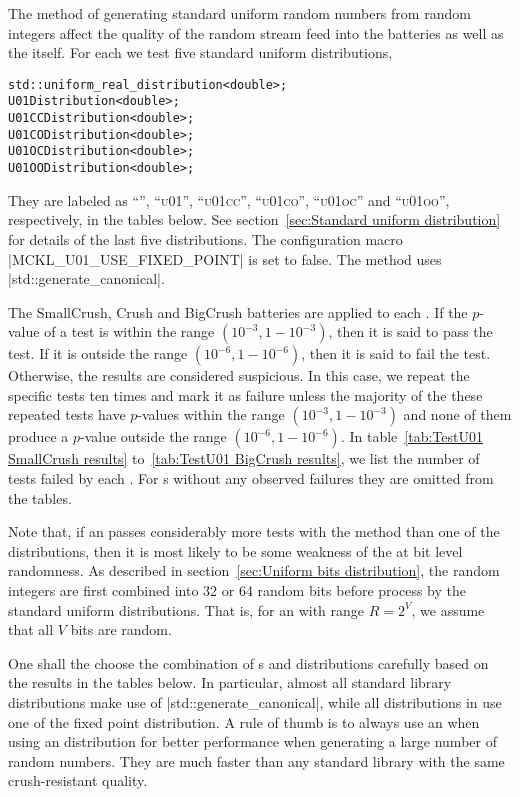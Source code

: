The method of generating standard uniform random numbers from random integers
affect the quality of the random stream feed into the \testu batteries as well
as the \rng itself. For each \rng we test five standard uniform distributions,
\begin{verbatim}
std::uniform_real_distribution<double>;
U01Distribution<double>;
U01CCDistribution<double>;
U01CODistribution<double>;
U01OCDistribution<double>;
U01OODistribution<double>;
\end{verbatim}
They are labeled as ``\std'', ``\textsc{u01}'', ``\textsc{u01cc}'',
``\textsc{u01co}'', ``\textsc{u01oc}'' and ``\textsc{u01oo}'', respectively, in
the tables below. See section~\ref{sec:Standard uniform distribution} for
details of the last five distributions. The configuration macro
|MCKL_U01_USE_FIXED_POINT| is set to false. The \std method uses
|std::generate_canonical|.

The SmallCrush, Crush and BigCrush batteries are applied to each \rng. If the
$p$-value of a test is within the range $(10^{-3}, 1 - 10^{-3})$, then it is
said to pass the test. If it is outside the range $(10^{-6}, 1 - 10^{-6})$,
then it is said to fail the test. Otherwise, the results are considered
suspicious. In this case, we repeat the specific tests ten times and mark it as
failure unless the majority of the these repeated tests have $p$-values within
the range $(10^{-3}, 1 - 10^{-3})$ and none of them produce a $p$-value outside
the range $(10^{-6}, 1 - 10^{-6})$. In table~\ref{tab:TestU01 SmallCrush
results} to~\ref{tab:TestU01 BigCrush results}, we list the number of tests
failed by each \rng. For \rng{}s without any observed failures they are omitted
from the tables.

Note that, if an \rng passes considerably more tests with the \std method than
one of the \mckl distributions, then it is most likely to be some weakness of
the \rng at bit level randomness. As described in section~\ref{sec:Uniform bits
distribution}, the random integers are first combined into 32 or 64 random bits
before process by the standard uniform distributions. That is, for an \rng with
range $R = 2^V$, we assume that all $V$ bits are random.

One shall the choose the combination of \rng{}s and distributions carefully
based on the results in the tables below. In particular, almost all standard
library distributions make use of |std::generate_canonical|, while all
distributions in \mckl use one of the fixed point distribution. A rule of thumb
is to always use an \mckl \rng when using an \mckl distribution for better
performance when generating a large number of random numbers. They are much
faster than any standard library \rng with the same crush-resistant quality.

